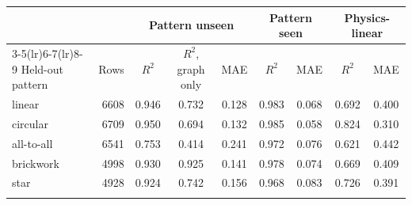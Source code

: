 \begin{tabular}{lrccccccc}
\toprule
 & & \multicolumn{3}{c}{Pattern unseen} & \multicolumn{2}{c}{Pattern seen} & \multicolumn{2}{c}{Physics-linear} \\
\cmidrule(lr){3-5}\cmidrule(lr){6-7}\cmidrule(lr){8-9}
Held-out pattern & Rows & $R^2$ & $R^2$, graph only & MAE & $R^2$ & MAE & $R^2$ & MAE \\
\midrule
linear & 6608 & 0.946 & 0.732 & 0.128 & 0.983 & 0.068 & 0.692 & 0.400 \\
circular & 6709 & 0.950 & 0.694 & 0.132 & 0.985 & 0.058 & 0.824 & 0.310 \\
all-to-all & 6541 & 0.753 & 0.414 & 0.241 & 0.972 & 0.076 & 0.621 & 0.442 \\
brickwork & 4998 & 0.930 & 0.925 & 0.141 & 0.978 & 0.074 & 0.669 & 0.409 \\
star & 4928 & 0.924 & 0.742 & 0.156 & 0.968 & 0.083 & 0.726 & 0.391 \\
\botrule
\end{tabular}
